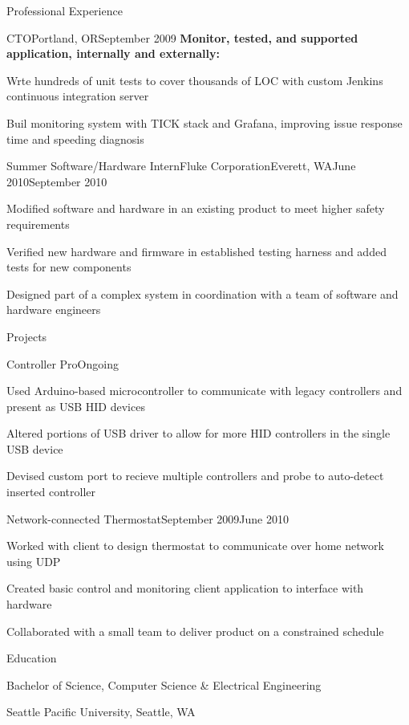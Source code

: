 \documentclass[letterpaper,10pt]{article}
\let\pt\pasttense
\let\anon\anonno
\begin{document}
\begin{res_section}{Professional Experience}
\begin{res_experienceitem}{CTO}{\anon{SERPs.com}{SaaSCo}}{Portland, OR}{September 2009}{{\pt[Present]{March 2017}}}
      \nonitem \textbf{Monitor\pt{ed}, tested, and supported application, internally and externally:}
      \item Wr\pt[i]{o}te hundreds of unit tests to cover thousands of LOC with custom Jenkins continuous integration server
      \item Buil\pt[d]{t} monitoring system with TICK stack and Grafana, improving issue response time and speeding diagnosis
    \end{res_experienceitem}
    \begin{res_experienceitem}{Summer Software/Hardware Intern}{Fluke Corporation}{Everett, WA}{June 2010}{September 2010}
      \item Modified software and hardware in an existing product to meet higher safety requirements
      \item Verified new hardware and firmware in established testing harness and added tests for new components
      \item Designed part of a complex system in coordination with a team of software and hardware engineers
    \end{res_experienceitem}
\end{res_section}
\begin{res_section}{Projects}
    \begin{res_experienceitem}{Controller Pro}{}{}{Ongoing}{}
        \item Used Arduino-based microcontroller to communicate with legacy controllers and present as USB HID devices
        \item Altered portions of USB driver to allow for more HID controllers in the single USB device
        \item Devised custom port to recieve multiple controllers and probe to auto-detect inserted controller
    \end{res_experienceitem}
    \begin{res_experienceitem}{Network-connected Thermostat}{}{}{September 2009}{June 2010}
        \item Worked with client to design thermostat to communicate over home network using UDP
        \item Created basic control and monitoring client application to interface with hardware
        \item Collaborated with a small team to deliver product on a constrained schedule
    \end{res_experienceitem}
\end{res_section}

\begin{res_section}{Education}
\begin{res_subsection}{Bachelor of Science, Computer Science \& Electrical Engineering}
    \item Seattle Pacific University, Seattle, WA
\end{res_subsection}
\end{res_section}
\end{document}
